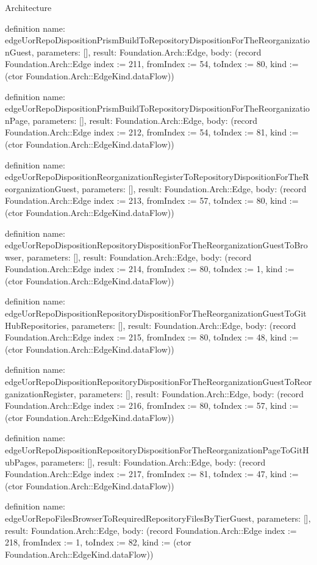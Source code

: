 \begin{lexlean}{Architecture}
\begin{semanticmodule}
definition{
  name: edgeUorRepoDispositionPrismBuildToRepositoryDispositionForTheReorganizationGuest,
  parameters: [],
  result: Foundation.Arch::Edge,
  body: (record Foundation.Arch::Edge {index := 211, fromIndex := 54, toIndex := 80, kind := (ctor Foundation.Arch::EdgeKind.dataFlow)})
}

definition{
  name: edgeUorRepoDispositionPrismBuildToRepositoryDispositionForTheReorganizationPage,
  parameters: [],
  result: Foundation.Arch::Edge,
  body: (record Foundation.Arch::Edge {index := 212, fromIndex := 54, toIndex := 81, kind := (ctor Foundation.Arch::EdgeKind.dataFlow)})
}

definition{
  name: edgeUorRepoDispositionReorganizationRegisterToRepositoryDispositionForTheReorganizationGuest,
  parameters: [],
  result: Foundation.Arch::Edge,
  body: (record Foundation.Arch::Edge {index := 213, fromIndex := 57, toIndex := 80, kind := (ctor Foundation.Arch::EdgeKind.dataFlow)})
}

definition{
  name: edgeUorRepoDispositionRepositoryDispositionForTheReorganizationGuestToBrowser,
  parameters: [],
  result: Foundation.Arch::Edge,
  body: (record Foundation.Arch::Edge {index := 214, fromIndex := 80, toIndex := 1, kind := (ctor Foundation.Arch::EdgeKind.dataFlow)})
}

definition{
  name: edgeUorRepoDispositionRepositoryDispositionForTheReorganizationGuestToGitHubRepositories,
  parameters: [],
  result: Foundation.Arch::Edge,
  body: (record Foundation.Arch::Edge {index := 215, fromIndex := 80, toIndex := 48, kind := (ctor Foundation.Arch::EdgeKind.dataFlow)})
}

definition{
  name: edgeUorRepoDispositionRepositoryDispositionForTheReorganizationGuestToReorganizationRegister,
  parameters: [],
  result: Foundation.Arch::Edge,
  body: (record Foundation.Arch::Edge {index := 216, fromIndex := 80, toIndex := 57, kind := (ctor Foundation.Arch::EdgeKind.dataFlow)})
}

definition{
  name: edgeUorRepoDispositionRepositoryDispositionForTheReorganizationPageToGitHubPages,
  parameters: [],
  result: Foundation.Arch::Edge,
  body: (record Foundation.Arch::Edge {index := 217, fromIndex := 81, toIndex := 47, kind := (ctor Foundation.Arch::EdgeKind.dataFlow)})
}

definition{
  name: edgeUorRepoFilesBrowserToRequiredRepositoryFilesByTierGuest,
  parameters: [],
  result: Foundation.Arch::Edge,
  body: (record Foundation.Arch::Edge {index := 218, fromIndex := 1, toIndex := 82, kind := (ctor Foundation.Arch::EdgeKind.dataFlow)})
}


\end{semanticmodule}
\end{lexlean}
